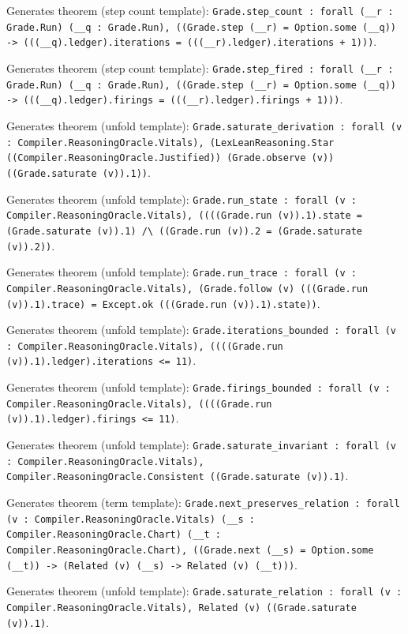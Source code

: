 \documentclass[11pt]{article}
\begin{document}
\noindent Generates theorem (step count template): \texttt{Grade.step\_count : forall (\_\_r : Grade.Run) (\_\_q : Grade.Run), ((Grade.step (\_\_r) = Option.some (\_\_q)) -> (((\_\_q).ledger).iterations = (((\_\_r).ledger).iterations + 1)))}.\par
\noindent Generates theorem (step count template): \texttt{Grade.step\_fired : forall (\_\_r : Grade.Run) (\_\_q : Grade.Run), ((Grade.step (\_\_r) = Option.some (\_\_q)) -> (((\_\_q).ledger).firings = (((\_\_r).ledger).firings + 1)))}.\par
\noindent Generates theorem (unfold template): \texttt{Grade.saturate\_derivation : forall (v : Compiler.ReasoningOracle.Vitals), (LexLeanReasoning.Star ((Compiler.ReasoningOracle.Justified)) (Grade.observe (v)) ((Grade.saturate (v)).1))}.\par
\noindent Generates theorem (unfold template): \texttt{Grade.run\_state : forall (v : Compiler.ReasoningOracle.Vitals), ((((Grade.run (v)).1).state = (Grade.saturate (v)).1) /\textbackslash{} ((Grade.run (v)).2 = (Grade.saturate (v)).2))}.\par
\noindent Generates theorem (unfold template): \texttt{Grade.run\_trace : forall (v : Compiler.ReasoningOracle.Vitals), (Grade.follow (v) (((Grade.run (v)).1).trace) = Except.ok (((Grade.run (v)).1).state))}.\par
\noindent Generates theorem (unfold template): \texttt{Grade.iterations\_bounded : forall (v : Compiler.ReasoningOracle.Vitals), ((((Grade.run (v)).1).ledger).iterations <= 11)}.\par
\noindent Generates theorem (unfold template): \texttt{Grade.firings\_bounded : forall (v : Compiler.ReasoningOracle.Vitals), ((((Grade.run (v)).1).ledger).firings <= 11)}.\par
\noindent Generates theorem (unfold template): \texttt{Grade.saturate\_invariant : forall (v : Compiler.ReasoningOracle.Vitals), Compiler.ReasoningOracle.Consistent ((Grade.saturate (v)).1)}.\par
\noindent Generates theorem (term template): \texttt{Grade.next\_preserves\_relation : forall (v : Compiler.ReasoningOracle.Vitals) (\_\_s : Compiler.ReasoningOracle.Chart) (\_\_t : Compiler.ReasoningOracle.Chart), ((Grade.next (\_\_s) = Option.some (\_\_t)) -> (Related (v) (\_\_s) -> Related (v) (\_\_t)))}.\par
\noindent Generates theorem (unfold template): \texttt{Grade.saturate\_relation : forall (v : Compiler.ReasoningOracle.Vitals), Related (v) ((Grade.saturate (v)).1)}.\par
\end{document}
